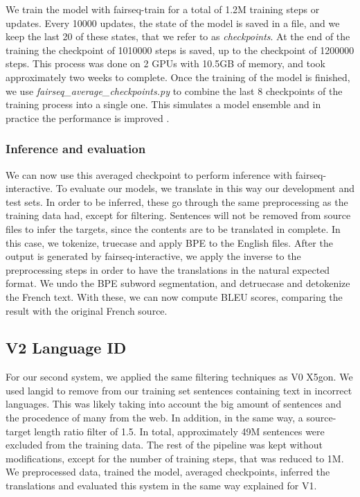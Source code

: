 \documentclass[11pt,english,listoffigures,listoftables]{tfgetsinf}
\begin{document}
We train the model with fairseq-train for a total of 1.2M training steps or updates. Every 10000 updates, the state of the model is saved in a file, and we keep the last 20 of these states, that we refer to as \textit{checkpoints}. At the end of the training the checkpoint of 1010000 steps is saved, up to the checkpoint of 1200000 steps.
This process was done on 2 GPUs with 10.5GB of memory, and took approximately two weeks to complete. Once the training of the model is finished, we use \textit{fairseq\_average\_checkpoints.py} to combine the last 8 checkpoints of the training process into a single one. This simulates a model ensemble and in practice the performance is improved \cite{https://doi.org/10.48550/arxiv.1710.03282}.

\subsubsection{Inference and evaluation}
We can now use this averaged checkpoint to perform inference with fairseq-interactive. To evaluate our models, we translate in this way our development and test sets. In order to be inferred, these go through the same preprocessing as the training data had, except for filtering. Sentences will not be removed from source files to infer the targets, since the contents are to be translated in complete. In this case, we tokenize, truecase and apply BPE to the English files. After the output is generated by fairseq-interactive, we apply the inverse to the preprocessing steps in order to have the translations in the natural expected format. We undo the BPE subword segmentation, and detruecase and detokenize the French text. With these, we can now compute BLEU scores, comparing the result with the original French source. %





\subsection{V2 Language ID}
For our second system, we applied the same filtering techniques as V0 X5gon. We used langid to remove from our training set sentences containing text in incorrect languages. This was likely taking into account the big amount of sentences and the procedence of many from the web. In addition, in the same way, a source-target length ratio filter of 1.5. In total, approximately 49M sentences were excluded from the training data.
The rest of the pipeline was kept without modifications, except for the number of training steps, that was reduced to 1M. We preprocessed data, trained the model, averaged checkpoints, inferred the translations and evaluated this system in the same way explained for V1.
\end{document}
